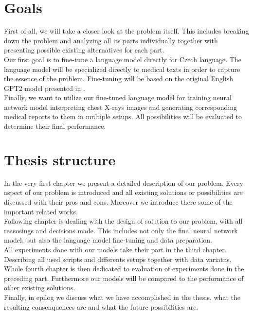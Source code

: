 \section*{Goals}
First of all, we will take a closer look at the problem itself. This includes breaking down the problem and analyzing all its parts individually together with presenting possible existing alternatives for each part. \\

Our first goal is to fine-tune a language model directly for Czech language. The language model will be specialized directly to medical texts in order to capture the essence of the problem. Fine-tuning will be based on the original English GPT2 model presented in \citet{radford2019language}.\\

Finally, we want to utilize our fine-tuned language model for training neural network model interpreting chest X-rays images and generating corresponding medical reports to them in multiple setups. All possibilities will be evaluated to determine their final performance.\\

\section*{Thesis structure}

In the very first chapter we present a detailed description of our problem. Every aspect of our problem is introduced and all existing solutions or possibilities are discussed with their pros and cons. Moreover we introduce there some of the important related works.\\

Following chapter is dealing with the design of solution to our problem, with all reasosings and decisions made. This includes not only the final neural network model, but also the language model fine-tuning and data preparation.\\

All experiments done with our models take their part in the third chapter. Describing all used scripts and differents setups together with data variatns.\\

Whole fourth chapter is then dedicated to evaluation of experiments done in the preceding part. Furthermore our models will be compared to the performance of other existing solutions.\\

Finally, in epilog we discuss what we have accomplished in the thesis, what the resulting consenquences are and what the future possibilities are.